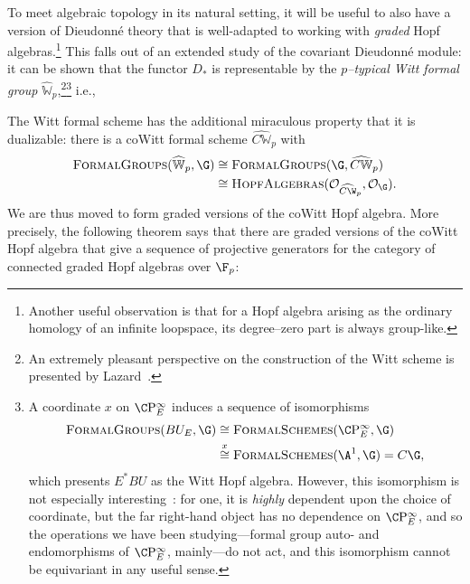 To meet algebraic topology in its natural setting, it will be useful to also have a version of Dieudonn\'e theory that is well-adapted to working with \emph{graded} Hopf algebras.\footnote{Another useful observation is that for a Hopf algebra arising as the ordinary homology of an infinite loopspace, its degree--zero part is always group-like.}  This falls out of an extended study of the covariant Dieudonn\'e module: it can be shown that the functor $D_*$ is representable by the \textit{$p$--typical Witt formal group} $\widehat{\mathbb W}_p$,\footnote{An extremely pleasant perspective on the construction of the Witt scheme is presented by Lazard~\cite[Chapter III]{LazardCFGs}.}\footnote{A coordinate \(x\) on \(\CP^\infty_E\) induces a sequence of isomorphisms
\begin{align*}
\CatOf{FormalGroups}(BU_E, \G) & \cong \CatOf{FormalSchemes}(\CP^\infty_E, \G) \\
& \stackrel{x}{\cong} \CatOf{FormalSchemes}(\A^1, \G) = C\G,
\end{align*}
which presents \(E^* BU\) as the Witt Hopf algebra.  However, this isomorphism is not especially interesting~\cite[Remark 18.1]{StricklandFPFP}: for one, it is \emph{highly} dependent upon the choice of coordinate, but the far right-hand object has no dependence on \(\CP^\infty_E\), and so the operations we have been studying---formal group auto- and endomorphisms of \(\CP^\infty_E\), mainly---do not act, and this isomorphism cannot be equivariant in any useful sense.} i.e.,
\begin{center}
\end{center}
The Witt formal scheme has the additional miraculous property that it is dualizable: there is a coWitt formal scheme $\widehat{C\mathbb W}_p$ with
\begin{align*}
\CatOf{FormalGroups}(\widehat{\mathbb W}_p, \G) & \cong \CatOf{FormalGroups}(\G, \widehat{C\mathbb W}_p) \\
& \cong \CatOf{HopfAlgebras}(\sheaf O_{\widehat{C\W}_p}, \sheaf O_{\G}).
\end{align*}
We are thus moved to form graded versions of the coWitt Hopf algebra.  More precisely, the following theorem says that there are graded versions of the coWitt Hopf algebra that give a sequence of projective generators for the category of connected graded Hopf algebras over \(\F_p\):

